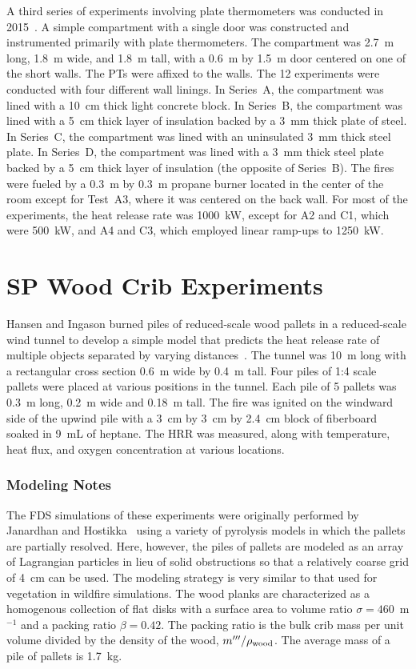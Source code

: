 A third series of experiments involving plate thermometers was conducted in 2015~\cite{Sjostrom:SP2016}. A simple compartment with a single door was constructed and instrumented primarily with plate thermometers. The compartment was 2.7~m long, 1.8~m wide, and 1.8~m tall, with a 0.6~m by 1.5~m door centered on one of the short walls. The PTs were affixed to the walls. The 12 experiments were conducted with four different wall linings. In Series~A, the compartment was lined with a 10~cm thick light concrete block. In Series~B, the compartment was lined with a 5~cm thick layer of insulation backed by a 3~mm thick plate of steel. In Series~C, the compartment was lined with an uninsulated 3~mm thick steel plate. In Series~D, the compartment was lined with a 3~mm thick steel plate backed by a 5~cm thick layer of insulation (the opposite of Series~B). The fires were fueled by a 0.3~m by 0.3~m propane burner located in the center of the room except for Test~A3, where it was centered on the back wall. For most of the experiments, the heat release rate was 1000~kW, except for A2 and C1, which were 500~kW, and A4 and C3, which employed linear ramp-ups to 1250~kW.


\section{SP Wood Crib Experiments}
\label{SP_Wood_Cribs_Description}

Hansen and Ingason burned piles of reduced-scale wood pallets in a reduced-scale wind tunnel to develop a simple model that predicts the heat release rate of multiple objects separated by varying distances~\cite{Hansen:2010,Hansen:FSJ2012}. The tunnel was 10~m long with a rectangular cross section 0.6~m wide by 0.4~m tall. Four piles of 1:4 scale pallets were placed at various positions in the tunnel. Each pile of 5 pallets was 0.3~m long, 0.2~m wide and 0.18~m tall. The fire was ignited on the windward side of the upwind pile with a 3~cm by 3~cm by 2.4~cm block of fiberboard soaked in 9~mL of heptane. The HRR was measured, along with temperature, heat flux, and oxygen concentration at various locations.

\subsubsection{Modeling Notes}

The FDS simulations of these experiments were originally performed by Janardhan and Hostikka~\cite{Janardhan:FT2019,Janardhan:FSJ2021} using a variety of pyrolysis models in which the pallets are partially resolved. Here, however, the piles of pallets are modeled as an array of Lagrangian particles in lieu of solid obstructions so that a relatively coarse grid of 4~cm can be used. The modeling strategy is very similar to that used for vegetation in wildfire simulations. The wood planks are characterized as a homogenous collection of flat disks with a surface area to volume ratio $\sigma=460$~m$^{-1}$ and a packing ratio $\beta=0.42$. The packing ratio is the bulk crib mass per unit volume divided by the density of the wood, $m'''/\rho_{\rm wood}$. The average mass of a pile of pallets is 1.7~kg.

